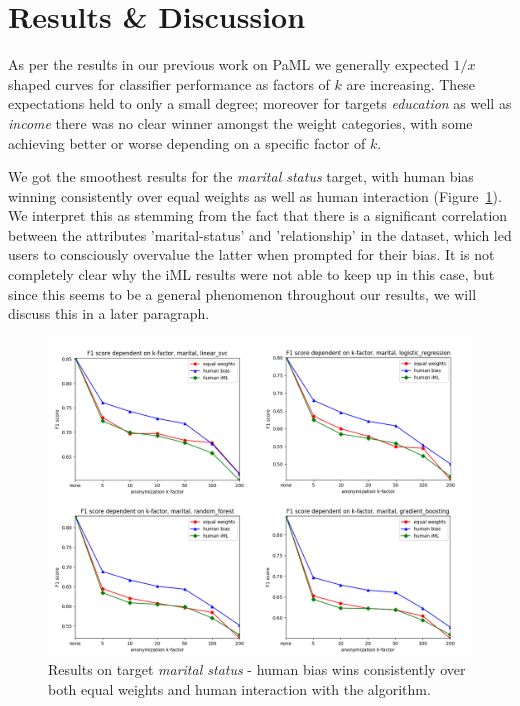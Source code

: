\documentclass{llncs}
\begin{document}
\section{Results \& Discussion}
\label{sect:results}

As per the results in our previous work on PaML \cite{malle2016right} \cite{MalleKieseHolzinger:2017:DoNotDisturb} we generally expected $1/x$ shaped curves for classifier performance as factors of $k$ are increasing. These expectations held to only a small degree; moreover for targets \textit{education} as well as \textit{income} there was no clear winner amongst the weight categories, with some achieving better or worse depending on a specific factor of $k$.

We got the smoothest results for the \textit{marital status} target, with human bias winning consistently over equal weights as well as human interaction (Figure~\ref{fig:results_marital}). We interpret this as stemming from the fact that there is a significant correlation between the attributes 'marital-status' and 'relationship' in the dataset, which led users to consciously overvalue the latter when prompted for their bias. It is not completely clear why the iML results were not able to keep up in this case, but since this seems to be a general phenomenon throughout our results, we will discuss this in a later paragraph.

\begin{figure}[!h]
	\begin{center}
		\includegraphics[width=1\textwidth]{figures/marital_status.png}
		\caption{Results on target \textit{marital status} - human bias wins consistently over both equal weights and human interaction with the algorithm.}
		\label{fig:results_marital}
	\end{center}
\end{figure}
\end{document}
